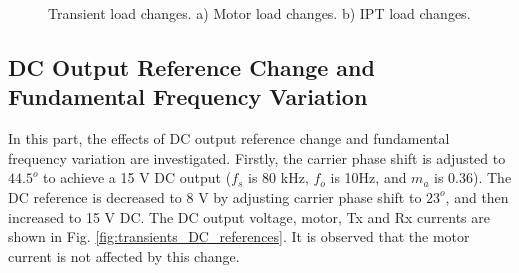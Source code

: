 \documentclass[journal]{IEEEtran}
\begin{document}
\begin{figure}[h!]
\centering
{}
        \caption{Transient load changes. a) Motor load changes. b) IPT load changes.}
    \label{fig:transients}
\end{figure}
\subsection{DC Output Reference Change and Fundamental Frequency Variation}
In this part, the effects of DC output reference change and fundamental frequency variation are investigated. Firstly, the carrier phase shift is adjusted to $44.5^o$ to achieve a 15 V DC output ($f_s$ is 80 kHz, $f_o$ is 10Hz, and $m_a$ is 0.36). The DC reference is decreased to 8 V by adjusting carrier phase shift to $23^o$, and then increased to 15 V DC. The DC output voltage, motor, Tx and Rx currents are shown in Fig. \ref{fig:transients_DC_references}.  It is observed that the motor current is not affected by this change.
\end{document}
